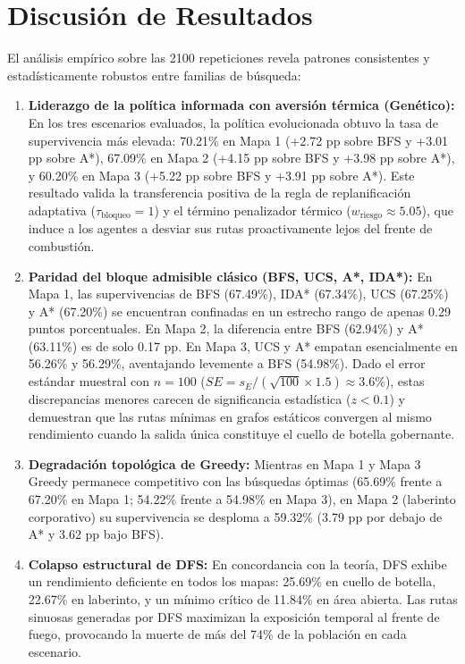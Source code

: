 \documentclass[11pt,letterpaper]{article}
\begin{document}
\section{Discusión de Resultados}

El análisis empírico sobre las 2100 repeticiones revela patrones consistentes y estadísticamente robustos entre familias de búsqueda:

\begin{enumerate}
    \item \textbf{Liderazgo de la política informada con aversión térmica (Genético):} En los tres escenarios evaluados, la política evolucionada obtuvo la tasa de supervivencia más elevada: 70.21\% en Mapa 1 (+2.72 pp sobre BFS y +3.01 pp sobre A*), 67.09\% en Mapa 2 (+4.15 pp sobre BFS y +3.98 pp sobre A*), y 60.20\% en Mapa 3 (+5.22 pp sobre BFS y +3.91 pp sobre A*). Este resultado valida la transferencia positiva de la regla de replanificación adaptativa ($\tau_{\text{bloqueo}}=1$) y el término penalizador térmico ($w_{\text{riesgo}} \approx 5.05$), que induce a los agentes a desviar sus rutas proactivamente lejos del frente de combustión.
    
    \item \textbf{Paridad del bloque admisible clásico (BFS, UCS, A*, IDA*):} En Mapa 1, las supervivencias de BFS (67.49\%), IDA* (67.34\%), UCS (67.25\%) y A* (67.20\%) se encuentran confinadas en un estrecho rango de apenas 0.29 puntos porcentuales. En Mapa 2, la diferencia entre BFS (62.94\%) y A* (63.11\%) es de solo 0.17 pp. En Mapa 3, UCS y A* empatan esencialmente en 56.26\% y 56.29\%, aventajando levemente a BFS (54.98\%). Dado el error estándar muestral con $n=100$ ($SE = s_E / (\sqrt{100} \times 1.5) \approx 3.6\%$), estas discrepancias menores carecen de significancia estadística ($z < 0.1$) y demuestran que las rutas mínimas en grafos estáticos convergen al mismo rendimiento cuando la salida única constituye el cuello de botella gobernante.
    
    \item \textbf{Degradación topológica de Greedy:} Mientras en Mapa 1 y Mapa 3 Greedy permanece competitivo con las búsquedas óptimas (65.69\% frente a 67.20\% en Mapa 1; 54.22\% frente a 54.98\% en Mapa 3), en Mapa 2 (laberinto corporativo) su supervivencia se desploma a 59.32\% (3.79 pp por debajo de A* y 3.62 pp bajo BFS).
    
    \item \textbf{Colapso estructural de DFS:} En concordancia con la teoría, DFS exhibe un rendimiento deficiente en todos los mapas: 25.69\% en cuello de botella, 22.67\% en laberinto, y un mínimo crítico de 11.84\% en área abierta. Las rutas sinuosas generadas por DFS maximizan la exposición temporal al frente de fuego, provocando la muerte de más del 74\% de la población en cada escenario.
\end{enumerate}
\end{document}
